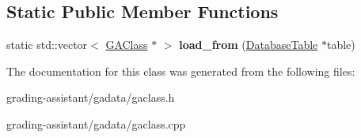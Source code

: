 \subsection*{Static Public Member Functions}
\begin{DoxyCompactItemize}
\item 
\mbox{\label{class_g_a_class_a0622a9e16a1dbecf97ec213b951e974b}} 
static std\+::vector$<$ \hyperlink{class_g_a_class}{G\+A\+Class} $\ast$ $>$ {\bfseries load\+\_\+from} (\hyperlink{class_database_table}{Database\+Table} $\ast$table)
\end{DoxyCompactItemize}


The documentation for this class was generated from the following files\+:\begin{DoxyCompactItemize}
\item 
grading-\/assistant/gadata/gaclass.\+h\item 
grading-\/assistant/gadata/gaclass.\+cpp\end{DoxyCompactItemize}
